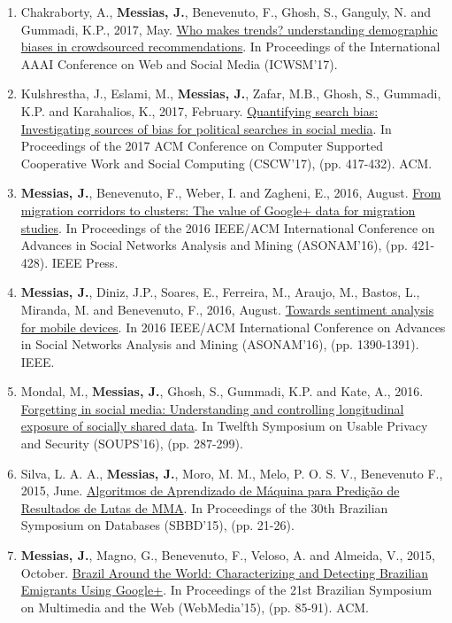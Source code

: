 \begin{enumerate}
    \item Chakraborty, A., \textbf{Messias, J.}, Benevenuto, F., Ghosh, S., Ganguly, N. and Gummadi, K.P., 2017, May. \href{https://people.mpi-sws.org/~johnme/pdf/chakraborty_icwsm17_who_makes_trends.pdf}{Who makes trends? understanding demographic biases in crowdsourced recommendations}. In Proceedings of the International AAAI Conference on Web and Social Media (ICWSM'17).
    \item Kulshrestha, J., Eslami, M., \textbf{Messias, J.}, Zafar, M.B., Ghosh, S., Gummadi, K.P. and Karahalios, K., 2017, February. \href{https://people.mpi-sws.org/~johnme/pdf/kulshrestha_cscw17_search_bias.pdf}{Quantifying search bias: Investigating sources of bias for political searches in social media}. In Proceedings of the 2017 ACM Conference on Computer Supported Cooperative Work and Social Computing (CSCW'17), (pp. 417-432). ACM.
    \item \textbf{Messias, J.}, Benevenuto, F., Weber, I. and Zagheni, E., 2016, August. \href{https://people.mpi-sws.org/~johnme/pdf/messias_asonam16_migration.pdf}{From migration corridors to clusters: The value of Google+ data for migration studies}. In Proceedings of the 2016 IEEE/ACM International Conference on Advances in Social Networks Analysis and Mining (ASONAM'16), (pp. 421-428). IEEE Press.
    \item \textbf{Messias, J.}, Diniz, J.P., Soares, E., Ferreira, M., Araujo, M., Bastos, L., Miranda, M. and Benevenuto, F., 2016, August. \href{https://people.mpi-sws.org/~johnme/pdf/messias_asonam16_mobile.pdf}{Towards sentiment analysis for mobile devices}. In 2016 IEEE/ACM International Conference on Advances in Social Networks Analysis and Mining (ASONAM'16), (pp. 1390-1391). IEEE.
    \item Mondal, M., \textbf{Messias, J.}, Ghosh, S., Gummadi, K.P. and Kate, A., 2016. \href{https://people.mpi-sws.org/~johnme/pdf/mainack_soups16.pdf}{Forgetting in social media: Understanding and controlling longitudinal exposure of socially shared data}. In Twelfth Symposium on Usable Privacy and Security (SOUPS'16), (pp. 287-299).
    \item Silva, L. A. A., \textbf{Messias, J.}, Moro, M. M., Melo, P. O. S. V., Benevenuto F., 2015, June. \href{https://people.mpi-sws.org/~johnme/pdf/leandro_sbbd15.pdf}{Algoritmos de Aprendizado de Máquina para Predição de Resultados de Lutas de MMA}. In Proceedings of the 30th Brazilian Symposium on Databases (SBBD'15), (pp. 21-26).
    \item \textbf{Messias, J.}, Magno, G., Benevenuto, F., Veloso, A. and Almeida, V., 2015, October. \href{https://people.mpi-sws.org/~johnme/pdf/messias_webmedia15.pdf}{Brazil Around the World: Characterizing and Detecting Brazilian Emigrants Using Google+}. In Proceedings of the 21st Brazilian Symposium on Multimedia and the Web (WebMedia'15), (pp. 85-91). ACM.

\end{enumerate}
